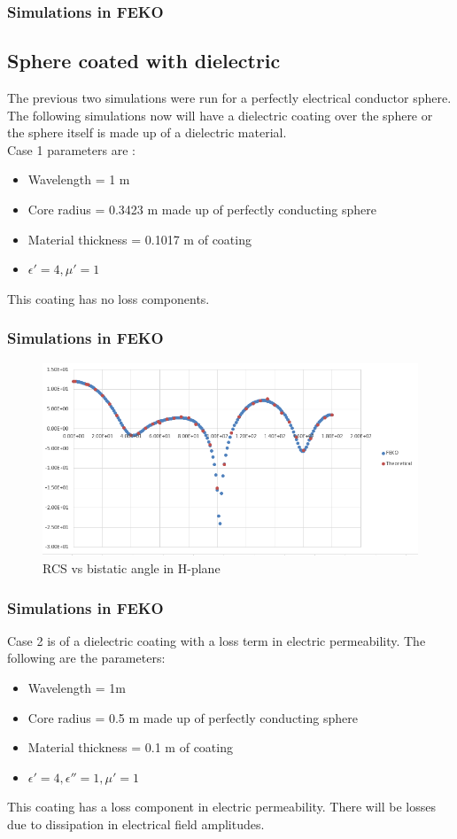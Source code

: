 \documentclass{beamer}
\begin{document}
\begin{frame}
\frametitle{Simulations in FEKO}
\subsection{Sphere coated with dielectric}
The previous two simulations were run for a perfectly electrical conductor sphere. The following simulations now will have a dielectric coating over the sphere  or the sphere itself is made up of a dielectric material.\\ 
Case 1 parameters are :
\begin{itemize}
\item Wavelength = 1 m
\item Core radius = 0.3423 m made up of perfectly conducting sphere
\item Material thickness = 0.1017 m of coating
\item $\epsilon'= 4, \mu' = 1$  
\end{itemize}
This coating has no loss components.
\end{frame}
\begin{frame}
\frametitle{Simulations in FEKO}
\begin{figure}[H]
\centering
\includegraphics[width = \textwidth]{case1.PNG}
\caption{RCS vs bistatic angle in H-plane}
\end{figure}
\end{frame}
\begin{frame}
\frametitle{Simulations in FEKO}
Case 2 is of a dielectric coating with a loss term in electric permeability. The following are the parameters:
\begin{itemize}
\item Wavelength = 1m
\item Core radius = 0.5 m made up of perfectly conducting sphere
\item Material thickness = 0.1 m of coating
\item $\epsilon' = 4, \epsilon'' = 1, \mu' = 1$
\end{itemize}
This coating has a loss component in electric permeability. There will be losses due to dissipation in electrical field amplitudes. 
\end{frame}
\end{document}
